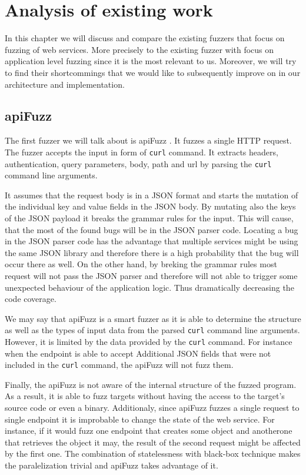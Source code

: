 \chapter{Analysis of existing work}
In this chapter we will discuss and compare the existing fuzzers that focus on fuzzing of web services. More precisely to the existing fuzzer with focus on application level fuzzing since it is the most relevant to us. \label{sub:Types of fuzzers} Moreover, we will try to find their shortcommings that we would like to subsequently improve on in our architecture and implementation.

\section{apiFuzz}
The first fuzzer we will talk about is apiFuzz \cite{apiFuzz2020github}. It fuzzes a single HTTP request. The fuzzer accepts the input in form of \texttt{curl} command. It extracts headers, authentication, query parameters, body, path and url by parsing the \texttt{curl} command line arguments.

It assumes that the request body is in a JSON format and starts the mutation of the individual key and value fields in the JSON body. By mutating also the keys of the JSON payload it breaks the grammar rules for the input. This will cause, that the most of the found bugs will be in the JSON parser code. Locating a bug in the JSON parser code has the advantage that multiple services might be using the same JSON library and therefore there is a high probability that the bug will occur there as well. On the other hand, by breking the grammar rules most request will not pass the JSON parser and therefore will not able to trigger some unexpected behaviour of the application logic. Thus dramatically decreasing the code coverage.

We may say that apiFuzz is a smart fuzzer as it is able to determine the structure as well as the types of input data from the parsed \texttt{curl} command line arguments. However, it is limited by the data provided by the \texttt{curl} command. For instance when the endpoint is able to accept Additional JSON fields that were not included in the \texttt{curl} command, the apiFuzz will not fuzz them.

Finally, the apiFuzz is not aware of the internal structure of the fuzzed program. As a result, it is able to fuzz targets without having the access to the target's source code or even a binary. Additionaly, since apiFuzz fuzzes a single request to single endpoint it is improbable to change the state of the web service. For instance, if it would fuzz one endpoint that creates some object and anotherone that retrieves the object it may, the result of the second request might be affected by the first one. The combination of statelessness with black-box technique makes the paralelization trivial and apiFuzz takes advantage of it.

